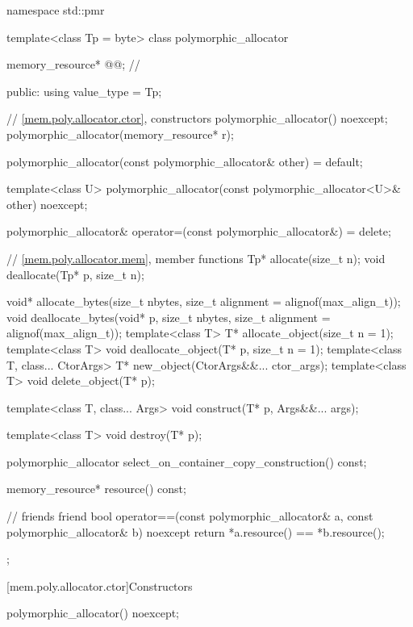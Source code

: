 %
%
\begin{codeblock}
namespace std::pmr {
  template<class Tp = byte> class polymorphic_allocator {
    memory_resource* @@;       // \expos

  public:
    using value_type = Tp;

    // \ref{mem.poly.allocator.ctor}, constructors
    polymorphic_allocator() noexcept;
    polymorphic_allocator(memory_resource* r);

    polymorphic_allocator(const polymorphic_allocator& other) = default;

    template<class U>
      polymorphic_allocator(const polymorphic_allocator<U>& other) noexcept;

    polymorphic_allocator& operator=(const polymorphic_allocator&) = delete;

    // \ref{mem.poly.allocator.mem}, member functions
    Tp* allocate(size_t n);
    void deallocate(Tp* p, size_t n);

    void* allocate_bytes(size_t nbytes, size_t alignment = alignof(max_align_t));
    void deallocate_bytes(void* p, size_t nbytes, size_t alignment = alignof(max_align_t));
    template<class T> T* allocate_object(size_t n = 1);
    template<class T> void deallocate_object(T* p, size_t n = 1);
    template<class T, class... CtorArgs> T* new_object(CtorArgs&&... ctor_args);
    template<class T> void delete_object(T* p);

    template<class T, class... Args>
      void construct(T* p, Args&&... args);

    template<class T>
      void destroy(T* p);

    polymorphic_allocator select_on_container_copy_construction() const;

    memory_resource* resource() const;

    // friends
    friend bool operator==(const polymorphic_allocator& a,
                           const polymorphic_allocator& b) noexcept {
      return *a.resource() == *b.resource();
    }
  };
}
\end{codeblock}

[mem.poly.allocator.ctor]{Constructors}

%
\begin{itemdecl}
polymorphic_allocator() noexcept;
\end{itemdecl}


